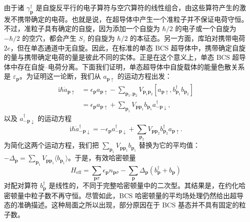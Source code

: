 由于诸 $\gamma_{\mathbf{p}}^{\dagger}$ 是自旋反平行的电子算符与空穴算符的线性组合，由这些算符产生的激发不携带确定的电荷。也就是说，在超导体中产生一个准粒子并不保证电荷守恒。不过，准粒子具有确定的自旋，因为添加一个自旋为 $\hbar/2$ 的电子或一个自旋为 $-\hbar/2$ 的空穴，都会产生 $S_{z}$ 的自旋为 $\hbar/2$ 的本征态。另一方面，库珀对携带电荷 $2e$，但在单态通道中无自旋。因此，在标准的单态 BCS 超导体中，携带确定自旋的量与携带确定电荷的量是彼此不同的实体。正是在这个意义上，单态 BCS 超导体中存在自旋–电荷分离。下面我们证明，单态超导体中自旋载体的能量色散关系是 $\varepsilon_{\mathbf{p}}$。为证明这一论断，我们从 $a_{\mathbf{p}\uparrow}$ 的运动方程出发：
\begin{align*}
\mathrm{i}\hbar\dot{a}_{\mathbf{p}\uparrow}&=\epsilon_{\mathbf{p}}a_{\mathbf{p}\uparrow}-\sum_{\mathbf{p}_{1},\mathbf{p}_{2}}V_{\mathbf{p}_{1}\mathbf{p}_{2}}\left[a_{\mathbf{p}\uparrow},b_{\mathbf{p}_{1}}^{\dagger}b_{\mathbf{p}_{2}}\right]\\
&=\epsilon_{\mathbf{p}}a_{\mathbf{p}\uparrow}+\sum_{\mathbf{p}_{1}}V_{\mathbf{p}\mathbf{p}_{1}}b_{\mathbf{p}_{1}}a_{-\mathbf{p}\downarrow}^{\dagger},\tag{12.225}
\end{align*}
以及 $a_{-\mathbf{p}\downarrow}^{\dagger}$ 的运动方程
\begin{equation*}
\mathrm{i}\hbar\dot{a}_{-\mathbf{p}\downarrow}^{\dagger}=-\epsilon_{\mathbf{p}}a_{-\mathbf{p}\downarrow}^{\dagger}+\sum_{\mathbf{p}_{2}}V_{\mathbf{p}\mathbf{p}_{2}}b_{\mathbf{p}_{2}}^{\dagger}a_{\mathbf{p}\uparrow}.\tag{12.226}
\end{equation*}
为简化这两个运动方程，我们把 $\sum_{\mathbf{p}_{1}}V_{\mathbf{p}\mathbf{p}_{1}}b_{\mathbf{p}_{1}}$ 替换为它的平均值：$-\Delta_{\mathbf{p}}=\sum_{\mathbf{p}_{1}}V_{\mathbf{p}\mathbf{p}_{1}}\langle b_{\mathbf{p}_{1}}\rangle$。于是，有效哈密顿量
\begin{equation*}
H_{\mathrm{eff}}=\sum_{\mathbf{p}\sigma}\epsilon_{\mathbf{p}}n_{\mathbf{p}\sigma}-\sum_{\mathbf{p}}\Delta_{\mathbf{p}}\left(b_{\mathbf{p}}^{\dagger}+b_{\mathbf{p}}\right)\tag{12.227}
\end{equation*}
对配对算符 $b_{\mathbf{p}}^{\dagger}$ 是线性的，不同于完整哈密顿量中的二次型。其结果是，在约化哈密顿量中粒子数不再守恒。尽管如此，BCS 哈密顿量的平均场处理仍然给出超导态的准确描述。这种局面之所以出现，部分原因在于 BCS 基态并不具有固定的粒子数。

